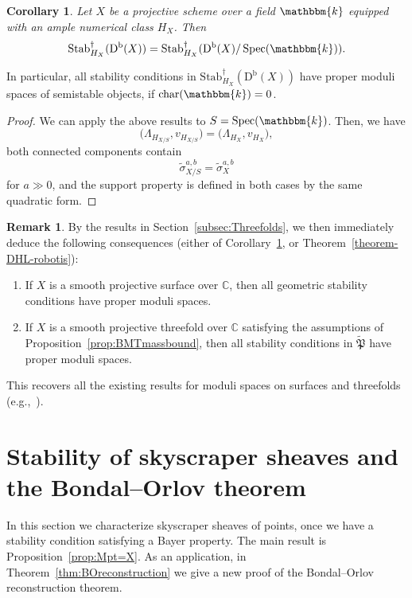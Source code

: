 \documentclass[11pt, reqno]{amsart}
\numberwithin{equation}{section}
\theoremstyle{plain}
\newtheorem{corollary}[theorem]{Corollary}
\theoremstyle{remark}
\theoremstyle{definition}
\newtheorem{remark}[theorem]{Remark}
\theoremstyle{italicsname}
\newcommand{\Db}{\mathrm{D^b}}
\newcommand{\Stabdagger}{\mathrm{Stab}^\dagger}
\DeclareMathOperator{\Spec}{Spec}
\newcommand{\KK}{\mathbbm{k}}
\def\CC{\ensuremath{\mathbb{C}}}
\begin{document}
\begin{corollary}\label{cor:Stabdagger=Stabdagger}
Let $X$ be a projective scheme over a field $\KK$ equipped with an ample numerical class $H_X$.  
Then
\[
\Stabdagger_{H_X}(\Db(X))=\Stabdagger_{H_{X}}(\Db(X)/\Spec(\KK)).
\]
\end{corollary}

In particular, all stability conditions in $\Stabdagger_{H_X}(\Db(X))$ have proper moduli spaces of semistable objects, if $\mathrm{char}(\KK)=0$.

\begin{proof}
We can apply the above results to $S=\Spec(\KK)$.
Then, we have
\[
\Big(\Lambda_{H_{X/S}},v_{H_{X/S}}\Big)=\Big(\Lambda_{H_{X}},v_{H_{X}}\Big),
\]
both connected components contain
\[
\widetilde{{\sigma}}^{a,b}_{X/S}=\widetilde{\sigma}^{a,b}_{X}
\]
for $a\gg0$, and the support property is defined in both cases by the same quadratic form.
\end{proof}

\begin{remark}\label{rmk:ModuliSurfacesThreefolds}
By the results in Section~\ref{subsec:Threefolds}, we then immediately deduce the following consequences (either of Corollary~\ref{cor:Stabdagger=Stabdagger}, or Theorem~\ref{theorem-DHL-robotis}):
\begin{enumerate}[{\rm (1)}]
\item\label{enum:ModuliSurfacesThreefolds1} If $X$ is a smooth projective surface over $\CC$, then all geometric stability conditions have proper moduli spaces.
\item\label{enum:ModuliSurfacesThreefolds2} If $X$ is a smooth projective threefold over $\CC$ satisfying the assumptions of Proposition~\ref{prop:BMTmassbound}, then all stability conditions in $\widetilde{\mathfrak{P}}$ have proper moduli spaces.
\end{enumerate}
This recovers all the existing results for moduli spaces on surfaces and threefolds (e.g.,~\cite{TodaK3,PT:Moduli}).
\end{remark}



\section{Stability of skyscraper sheaves and the Bondal--Orlov theorem}
\label{sec:BondalOrlov}

In this section we characterize skyscraper sheaves of points, once we have a stability condition satisfying a Bayer property.
The main result is Proposition~\ref{prop:Mpt=X}. 
As an application, in Theorem~\ref{thm:BOreconstruction} we give a new proof of the Bondal--Orlov reconstruction theorem.
\end{document}
